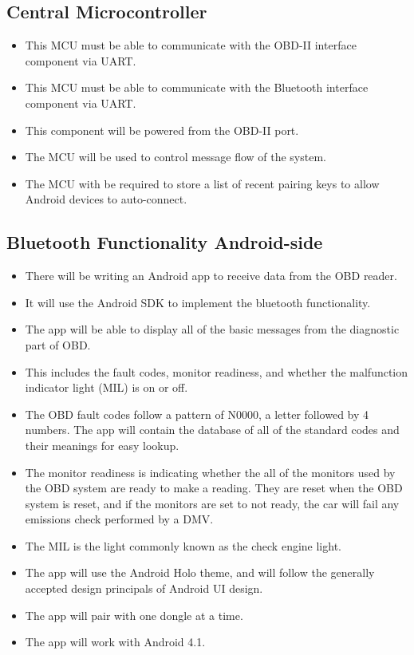 \documentclass[12pt,letterpaper]{article}
\begin{document}
\subsection{Central Microcontroller}
\begin{itemize}
	\item This MCU must be able to communicate with the OBD-II interface component via UART.
	\item This MCU must be able to communicate with the Bluetooth interface component via UART.
	\item This component will be powered from the OBD-II port.
	\item The MCU will be used to control message flow of the system.
	\item The MCU with be required to store a list of recent pairing keys to allow Android devices to auto-connect.
\end{itemize} 

\subsection{Bluetooth Functionality Android-side}
\begin{itemize}
	\item There will be writing an Android app to receive data from the OBD reader.
	\item It will use the Android SDK to implement the bluetooth functionality.
	\item The app will be able to display all of the basic messages from the diagnostic part of OBD.
	\item This includes the fault codes, monitor readiness, and whether the malfunction indicator light (MIL) is on or off.
	\item The OBD fault codes follow a pattern of N0000, a letter followed by 4 numbers. The app will contain the database of all of the standard codes and their meanings for easy lookup. 
	\item  The monitor readiness is indicating whether the all of the monitors used by the OBD system are ready to make a reading. They are reset when the OBD system is reset, and if the monitors are set to not ready, the car will fail any emissions check performed by a DMV. 
	\item The MIL is the light commonly known as the check engine light. 
	\item The app will use the Android Holo theme, and will follow the generally accepted design principals of Android UI design.
	\item The app will pair with one dongle at a time.
	\item The app will work with Android 4.1.

\end{itemize}
\end{document}
